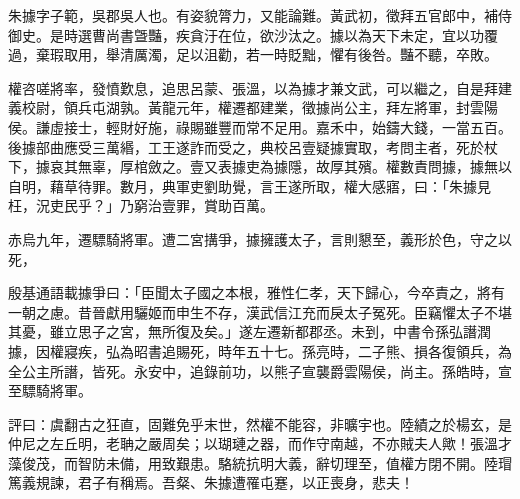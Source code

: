 
\begin{pinyinscope}
朱據字子範，吳郡吳人也。有姿貌膂力，又能論難。黃武初，徵拜五官郎中，補侍御史。是時選曹尚書曁豔，疾貪汙在位，欲沙汰之。據以為天下未定，宜以功覆過，棄瑕取用，舉清厲濁，足以沮勸，若一時貶黜，懼有後咎。豔不聽，卒敗。

權咨嗟將率，發憤歎息，追思呂蒙、張溫，以為據才兼文武，可以繼之，自是拜建義校尉，領兵屯湖孰。黃龍元年，權遷都建業，徵據尚公主，拜左將軍，封雲陽侯。謙虛接士，輕財好施，祿賜雖豐而常不足用。嘉禾中，始鑄大錢，一當五百。後據部曲應受三萬緡，工王遂詐而受之，典校呂壹疑據實取，考問主者，死於杖下，據哀其無辜，厚棺斂之。壹又表據吏為據隱，故厚其殯。權數責問據，據無以自明，藉草待罪。數月，典軍吏劉助覺，言王遂所取，權大感寤，曰：「朱據見枉，況吏民乎？」乃窮治壹罪，賞助百萬。

赤烏九年，遷驃騎將軍。遭二宮搆爭，據擁護太子，言則懇至，義形於色，守之以死，

殷基通語載據爭曰：「臣聞太子國之本根，雅性仁孝，天下歸心，今卒責之，將有一朝之慮。昔晉獻用驪姬而申生不存，漢武信江充而戾太子冤死。臣竊懼太子不堪其憂，雖立思子之宮，無所復及矣。」遂左遷新都郡丞。未到，中書令孫弘譖潤據，因權寢疾，弘為昭書追賜死，時年五十七。孫亮時，二子熊、損各復領兵，為全公主所譖，皆死。永安中，追錄前功，以熊子宣襲爵雲陽侯，尚主。孫皓時，宣至驃騎將軍。

評曰：虞翻古之狂直，固難免乎末世，然權不能容，非曠宇也。陸績之於楊玄，是仲尼之左丘明，老聃之嚴周矣；以瑚璉之器，而作守南越，不亦賊夫人歟！張溫才藻俊茂，而智防未備，用致艱患。駱統抗明大義，辭切理至，值權方閉不開。陸瑁篤義規諫，君子有稱焉。吾粲、朱據遭罹屯蹇，以正喪身，悲夫！


\end{pinyinscope}